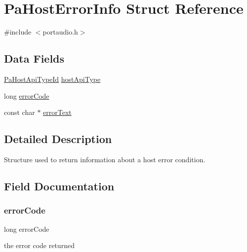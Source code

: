 \hypertarget{struct_pa_host_error_info}{}\section{Pa\+Host\+Error\+Info Struct Reference}
\label{struct_pa_host_error_info}


{\ttfamily \#include $<$portaudio.\+h$>$}

\subsection*{Data Fields}
\begin{DoxyCompactItemize}
\item 
\hyperlink{portaudio_8h_a8eaebe3d39c5ea45598da8f86dc2e5ae}{Pa\+Host\+Api\+Type\+Id} \hyperlink{struct_pa_host_error_info_a4dd82de4eeb322a84395aa4473a9e9eb}{host\+Api\+Type}
\item 
long \hyperlink{struct_pa_host_error_info_ab45055de57c7cd4878922c407af0a02c}{error\+Code}
\item 
const char $\ast$ \hyperlink{struct_pa_host_error_info_adbe18e10451bd8db096127da7cb2e802}{error\+Text}
\end{DoxyCompactItemize}


\subsection{Detailed Description}
Structure used to return information about a host error condition. 

\subsection{Field Documentation}
\mbox{\label{struct_pa_host_error_info_ab45055de57c7cd4878922c407af0a02c}} 
\subsubsection{\texorpdfstring{error\+Code}{errorCode}}
{\footnotesize\ttfamily long error\+Code}

the error code returned \mbox{\label{struct_pa_host_error_info_adbe18e10451bd8db096127da7cb2e802}} 
